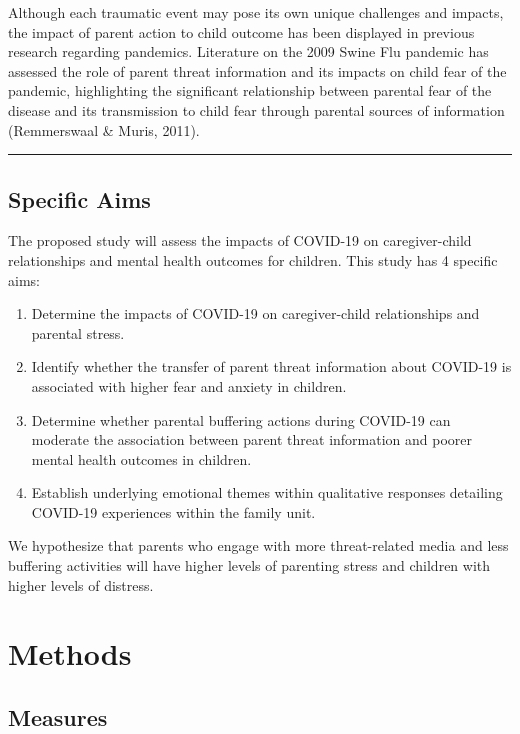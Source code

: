 \documentclass[]{book}
\providecommand{\tightlist}{%
  \setlength{\itemsep}{0pt}\setlength{\parskip}{0pt}}
\begin{document}
Although each traumatic event may pose its own unique challenges and impacts, the impact of parent action to child outcome has been displayed in previous research regarding pandemics. Literature on the 2009 Swine Flu pandemic has assessed the role of parent threat information and its impacts on child fear of the pandemic, highlighting the significant relationship between parental fear of the disease and its transmission to child fear through parental sources of information (Remmerswaal \& Muris, 2011).

\begin{center}\rule{0.5\linewidth}{0.5pt}\end{center}

\hypertarget{specific-aims}{%
\section{Specific Aims}\label{specific-aims}}

The proposed study will assess the impacts of COVID-19 on caregiver-child relationships and mental health outcomes for children. This study has 4 specific aims:

\begin{enumerate}
\def\labelenumi{(\arabic{enumi})}
\tightlist
\item
  Determine the impacts of COVID-19 on caregiver-child relationships and parental stress.
\item
  Identify whether the transfer of parent threat information about COVID-19 is associated with higher fear and anxiety in children.
\item
  Determine whether parental buffering actions during COVID-19 can moderate the association between parent threat information and poorer mental health outcomes in children.
\item
  Establish underlying emotional themes within qualitative responses detailing COVID-19 experiences within the family unit.
\end{enumerate}

We hypothesize that parents who engage with more threat-related media and less buffering activities will have higher levels of parenting stress and children with higher levels of distress.

\hypertarget{methods}{%
\chapter{Methods}\label{methods}}

\hypertarget{measures}{%
\section{Measures}\label{measures}}
\end{document}
